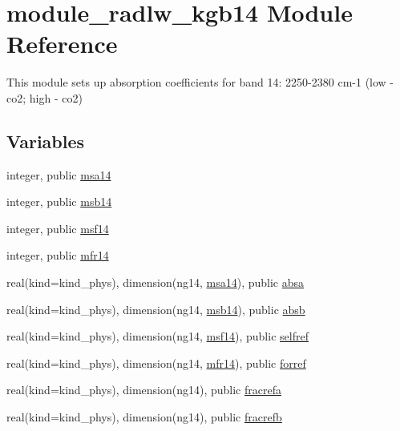 \hypertarget{namespacemodule__radlw__kgb14}{}\section{module\+\_\+radlw\+\_\+kgb14 Module Reference}
\label{namespacemodule__radlw__kgb14}


This module sets up absorption coefficients for band 14\+: 2250-\/2380 cm-\/1 (low -\/ co2; high -\/ co2)  


\subsection*{Variables}
\begin{DoxyCompactItemize}
\item 
integer, public \hyperlink{namespacemodule__radlw__kgb14_a9357fbaa5663438f0c0062a45c99a8d4}{msa14}
\item 
integer, public \hyperlink{namespacemodule__radlw__kgb14_a2d400a2aa969f2b2b6efd15555b67159}{msb14}
\item 
integer, public \hyperlink{namespacemodule__radlw__kgb14_a37c15d52e45cd6b36dc246a059b0c5ca}{msf14}
\item 
integer, public \hyperlink{namespacemodule__radlw__kgb14_a52354badbce95c005b19bd5a443fd488}{mfr14}
\item 
real(kind=kind\+\_\+phys), dimension(ng14, \hyperlink{namespacemodule__radlw__kgb14_a9357fbaa5663438f0c0062a45c99a8d4}{msa14}), public \hyperlink{namespacemodule__radlw__kgb14_ab57cb029ede27280bc99641f39ab3a81}{absa}
\item 
real(kind=kind\+\_\+phys), dimension(ng14, \hyperlink{namespacemodule__radlw__kgb14_a2d400a2aa969f2b2b6efd15555b67159}{msb14}), public \hyperlink{namespacemodule__radlw__kgb14_aa7a122319c49f3c1e8d51d21771cb63d}{absb}
\item 
real(kind=kind\+\_\+phys), dimension(ng14, \hyperlink{namespacemodule__radlw__kgb14_a37c15d52e45cd6b36dc246a059b0c5ca}{msf14}), public \hyperlink{namespacemodule__radlw__kgb14_a0e390a41b1c9e2ece765d65774060bca}{selfref}
\item 
real(kind=kind\+\_\+phys), dimension(ng14, \hyperlink{namespacemodule__radlw__kgb14_a52354badbce95c005b19bd5a443fd488}{mfr14}), public \hyperlink{namespacemodule__radlw__kgb14_a8478067cb8a07a02b56c09fa3c73eb67}{forref}
\item 
real(kind=kind\+\_\+phys), dimension(ng14), public \hyperlink{namespacemodule__radlw__kgb14_ae1e7065b9ea30b36a3665ad594545e9b}{fracrefa}
\item 
real(kind=kind\+\_\+phys), dimension(ng14), public \hyperlink{namespacemodule__radlw__kgb14_a13a211bf8a903d0720fa72ac90e4fc3f}{fracrefb}
\end{DoxyCompactItemize}


